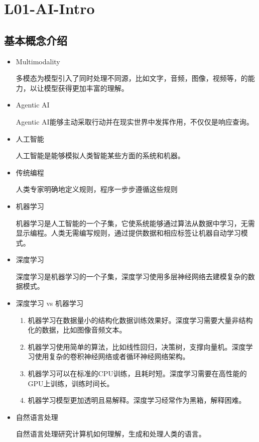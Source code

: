 \documentclass[UTF8]{ctexart}
\begin{document}
\section{L01-AI-Intro}
\subsection{基本概念介绍}
\begin{itemize}
    \item Multimodality
    
    多模态为模型引入了同时处理不同源，比如文字，音频，图像，视频等，的能力，以让模型获得更加丰富的理解。

    \item Agentic AI
    
    Agentic AI能够主动采取行动并在现实世界中发挥作用，不仅仅是响应查询。

    \item 人工智能
    
    人工智能是能够模拟人类智能某些方面的系统和机器。

    \item 传统编程
    
    人类专家明确地定义规则，程序一步步遵循这些规则

    \item 机器学习
    
    机器学习是人工智能的一个子集，它使系统能够通过算法从数据中学习，无需显示编程。人类无需编写规则，通过提供数据和相应标签让机器自动学习模式。

    \item 深度学习
    
    深度学习是机器学习的一个子集，深度学习使用多层神经网络去建模复杂的数据模式。

    \item 深度学习 vs 机器学习
    
    \begin{enumerate}
        \item 机器学习在数据量小的结构化数据训练效果好。深度学习需要大量非结构化的数据，比如图像音频文本。
        \item 机器学习使用简单的算法，比如线性回归，决策树，支撑向量机。深度学习使用复杂的卷积神经网络或者循环神经网络架构。
        \item 机器学习可以在标准的CPU训练，且耗时短。深度学习需要在高性能的GPU上训练，训练时间长。
        \item 机器学习模型更加透明且易解释。深度学习经常作为黑箱，解释困难。
    \end{enumerate}
    
    \item 自然语言处理
    
    自然语言处理研究计算机如何理解，生成和处理人类的语言。


\end{itemize}
\end{document}
